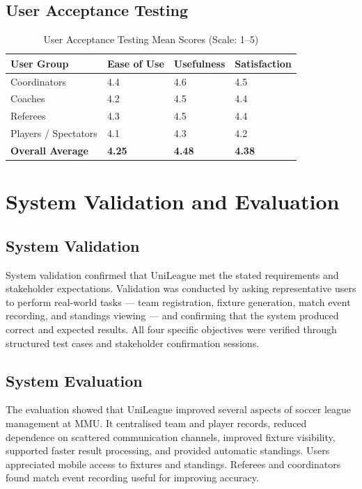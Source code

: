 \documentclass[12pt,a4paper]{report}
\begin{document}
\subsection{User Acceptance Testing}
\begin{table}[H]
\centering
\caption{User Acceptance Testing Mean Scores (Scale: 1--5)}
\begin{tabular}{p{4.5cm}p{3cm}p{3cm}p{3cm}}
\toprule
\textbf{User Group} & \textbf{Ease of Use} & \textbf{Usefulness} & \textbf{Satisfaction}\\
\midrule
Coordinators & 4.4 & 4.6 & 4.5\\
Coaches & 4.2 & 4.5 & 4.4\\
Referees & 4.3 & 4.5 & 4.4\\
Players / Spectators & 4.1 & 4.3 & 4.2\\
\textbf{Overall Average} & \textbf{4.25} & \textbf{4.48} & \textbf{4.38}\\
\bottomrule
\end{tabular}
\end{table}

\section{System Validation and Evaluation}

\subsection{System Validation}
System validation confirmed that UniLeague met the stated requirements and stakeholder
expectations. Validation was conducted by asking representative users to perform real-world
tasks --- team registration, fixture generation, match event recording, and standings viewing
--- and confirming that the system produced correct and expected results. All four specific
objectives were verified through structured test cases and stakeholder confirmation sessions.

\subsection{System Evaluation}
The evaluation showed that UniLeague improved several aspects of soccer league management at
MMU. It centralised team and player records, reduced dependence on scattered communication
channels, improved fixture visibility, supported faster result processing, and provided
automatic standings. Users appreciated mobile access to fixtures and standings. Referees and
coordinators found match event recording useful for improving accuracy.
\end{document}
